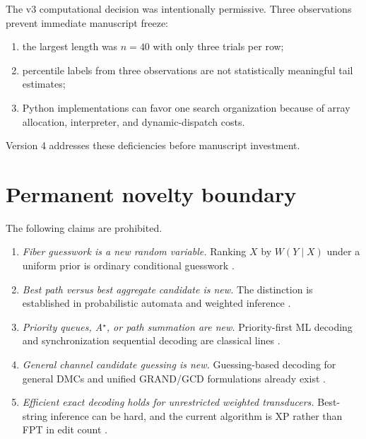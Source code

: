 \documentclass[11pt]{article}
\theoremstyle{definition}
\theoremstyle{remark}
\begin{document}
The v3 computational decision was intentionally permissive.  Three observations prevent immediate manuscript freeze:
\begin{enumerate}[label=(\alph*),leftmargin=2em]
\item the largest length was $n=40$ with only three trials per row;
\item percentile labels from three observations are not statistically meaningful tail estimates;
\item Python implementations can favor one search organization because of array allocation, interpreter, and dynamic-dispatch costs.
\end{enumerate}
Version 4 addresses these deficiencies before manuscript investment.

\section{Permanent novelty boundary}
The following claims are prohibited.
\begin{enumerate}[leftmargin=2em]
\item \emph{Fiber guesswork is a new random variable.}  Ranking $X$ by $W(Y\mid X)$ under a uniform prior is ordinary conditional guesswork \cite{Arikan1996,Li2018}.
\item \emph{Best path versus best aggregate candidate is new.}  The distinction is established in probabilistic automata and weighted inference \cite{HigueraOncina2014,Mohri2009}.
\item \emph{Priority queues, A$^\star$, or path summation are new.}  Priority-first ML decoding and synchronization sequential decoding are classical lines \cite{Gallager1961,Han1993,Banerjee2022}.
\item \emph{General channel candidate guessing is new.}  Guessing-based decoding for general DMCs and unified GRAND/GCD formulations already exist \cite{TanJoudeh2025,Wang2025}.
\item \emph{Efficient exact decoding holds for unrestricted weighted transducers.}  Best-string inference can be hard, and the current algorithm is XP rather than FPT in edit count \cite{HigueraOncina2014,Fijalkow2022}.
\end{enumerate}
\end{document}
